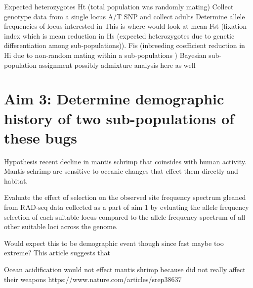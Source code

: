 \documentclass[11pt]{article}
\begin{document}
Expected heterozygotes Ht (total population was randomly mating)
Collect genotype data from a single locus A/T SNP and collect
adults 
Determine allele frequencies of locus interested in
This is where would look at mean Fst (fixation index which is mean reduction in Hs (expected heterozygotes due to genetic differentiation among sub-populations)).
Fis (inbreeding coefficient reduction in Hi due to non-random mating within a sub-populations )
Bayesian sub-population assignment 
possibly admixture analysis here as well


\section*{Aim 3: Determine demographic history of two sub-populations of these bugs}

Hypothesis recent decline in mantis schrimp that coinsides with
human activity. Mantis schrimp are sensitive to oceanic changes that effect them directly and habitat. 

Evaluate the effect of selection on the observed site frequency spectrum gleaned from RAD-seq data collected as a part of aim 1 by evluating the allele frequency selection of each suitable locus compared to the allele frequency spectrum of all other suitable loci across the genome. 

Would expect this to be demographic event though since fast maybe too extreme? This article suggests that 

Ocean acidification would not effect mantis shrimp because did not really affect their weapons
https://www.nature.com/articles/srep38637
\end{document}
